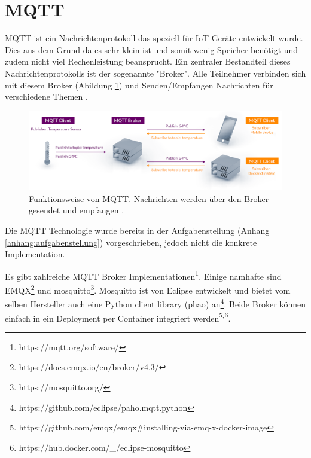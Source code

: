
\section{MQTT} %
\label{state:mqtt}

\ac{MQTT} ist ein Nachrichtenprotokoll das speziell für \ac{IoT} Geräte entwickelt wurde.
Dies aus dem Grund da es sehr klein ist und somit wenig Speicher benötigt und zudem
nicht viel Rechenleistung beansprucht.
Ein zentraler Bestandteil dieses Nachrichtenprotokolls ist der sogenannte "Broker".
Alle Teilnehmer verbinden sich mit diesem Broker (Abildung \ref{fig:mqtt}) und Senden/Empfangen Nachrichten
für verschiedene Themen \parencite{mqtt}.

\begin{figure}[H]
    \centering
    \includegraphics[width=1.0\textwidth]{gfx/mqtt-publish-subscribe}
    \caption{
        Funktionsweise von \ac{MQTT}. Nachrichten werden über den Broker gesendet und empfangen \parencite{mqtt}.
    }
    \label{fig:mqtt}
\end{figure}

Die \ac{MQTT} Technologie wurde bereits in der Aufgabenstellung (Anhang \ref{anhang:aufgabenstellung}) vorgeschrieben, jedoch
nicht die konkrete Implementation.

Es gibt zahlreiche \ac{MQTT} Broker Implementationen\footnote{https://mqtt.org/software/}.
Einige namhafte sind EMQX\footnote{https://docs.emqx.io/en/broker/v4.3/} und mosquitto\footnote{https://mosquitto.org/}.
Mosquitto ist von Eclipse entwickelt und bietet vom selben Hersteller auch eine
Python client library (phao) an\footnote{https://github.com/eclipse/paho.mqtt.python}.
Beide Broker können einfach in ein Deployment per Container integriert werden\footnote{https://github.com/emqx/emqx\#installing-via-emq-x-docker-image}$^{,}$\footnote{https://hub.docker.com/\_/eclipse-mosquitto}.

